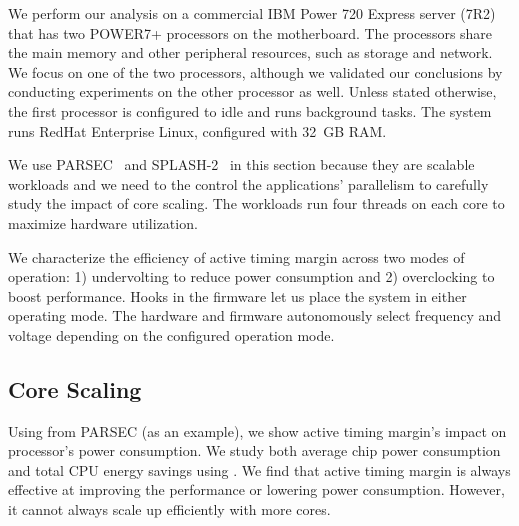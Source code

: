 We perform our analysis on a commercial IBM Power 720 Express server (7R2) that has two POWER7+ processors on the motherboard. The processors share the main memory and other peripheral resources, such as storage and network. We focus on one of the two processors, although we validated our conclusions by conducting experiments on the other processor as well. Unless stated otherwise, the first processor is configured to idle and runs background tasks. The system runs RedHat Enterprise Linux, configured with 32~GB RAM. 

We use PARSEC~\cite{bienia2008parsec} and SPLASH-2~\cite{woo1995splash,bienia2008parsecsplash} in this section because they are scalable workloads and we need to the control the applications' parallelism to carefully study the impact of core scaling. The workloads run four threads on each core to maximize hardware utilization.

We characterize the efficiency of active timing margin across two modes of operation: 1) undervolting to reduce power consumption and 2) overclocking to boost performance. Hooks in the firmware let us place the system in either operating mode. The hardware and firmware autonomously select frequency and voltage depending on the configured operation mode.

\subsection{Core Scaling}
\label{sec:voltage:characterization:scaling-trends}
Using  from PARSEC (as an example), we show active timing margin's impact on processor's power consumption. We study both average chip power consumption and total CPU energy savings using . We find that active timing margin is always effective at improving the performance or lowering power consumption. However, it cannot always scale up efficiently with more cores. 

